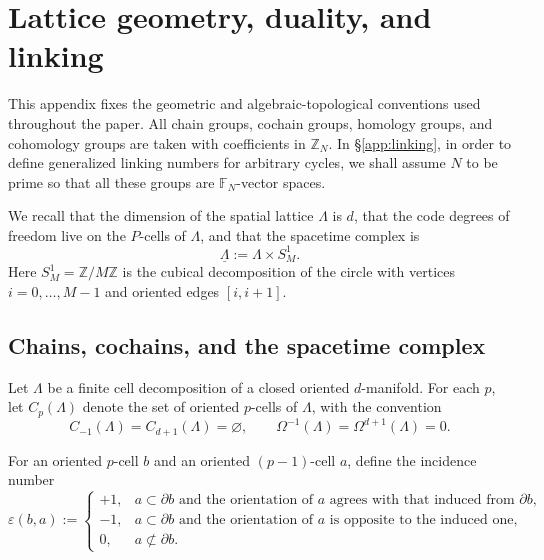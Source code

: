 \section{Lattice geometry, duality, and linking}
\label{app:geometry}

This appendix fixes the geometric and algebraic-topological conventions used throughout the
paper. All chain groups, cochain groups, homology groups, and cohomology groups are taken
with coefficients in $\mathbb Z_N$. In \S\ref{app:linking}, in order to define generalized linking numbers for arbitrary cycles, we shall assume $N$ to be prime so that all these groups are $\mathbb F_N$-vector spaces.

We recall that the dimension of the spatial lattice $\Lambda$ is $d$, that the code degrees of freedom live on the \(P\)-cells of \(\Lambda\), and that the spacetime complex is
\begin{equation}
	\underline\Lambda:=\Lambda\times S^1_M .
	\label{eq:spacetime}
\end{equation}
Here \(S^1_M=\mathbb Z/M\mathbb Z\) is the cubical decomposition of the circle with
vertices \(i=0,\dots,M-1\) and oriented edges \([i,i+1]\).

\subsection{Chains, cochains, and the spacetime complex}\label{app:geometryBasics}

Let \(\Lambda\) be a finite cell decomposition of a closed oriented \(d\)-manifold.
For each \(p\), let \(C_p(\Lambda)\) denote the set of oriented \(p\)-cells of \(\Lambda\),
with the convention
\begin{equation}
	C_{-1}(\Lambda)=C_{d+1}(\Lambda)=\varnothing,
	\qquad
	\Omega^{-1}(\Lambda)=\Omega^{d+1}(\Lambda)=0.
\end{equation}

For an oriented \(p\)-cell \(b\) and an oriented \((p-1)\)-cell \(a\), define the
incidence number
\begin{equation}
	\varepsilon(b,a):=
	\begin{cases}
		+1, & a\subset \partial b \text{ and the orientation of } a
		\text{ agrees with that induced from } \partial b,\\
		-1, & a\subset \partial b \text{ and the orientation of } a
		\text{ is opposite to the induced one},\\
		0, & a\not\subset \partial b.
	\end{cases}
	\label{eq:incidence}
\end{equation}

